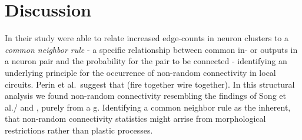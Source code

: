 

\section{Discussion}\label{sec:discussion}



In their study \textcite{Perin2011} were able to relate increased
edge-counts in neuron clusters to a \textit{common neighbor rule} - a
specific relationship between common in- or outputs in a neuron pair
and the probability for the pair to be connected - identifying an
underlying principle for the occurrence of non-random connectivity in
local circuits. Perin et al.\ suggest that (fire together wire
together). In this structural analysis we found non-random
connectivity resembling the findings of Song et al./ and , purely from
a g. Identifying a common neighbor rule as the inherent, that
non-random connectivity statistics might arrise from morphological
restrictions rather than plastic processes.



